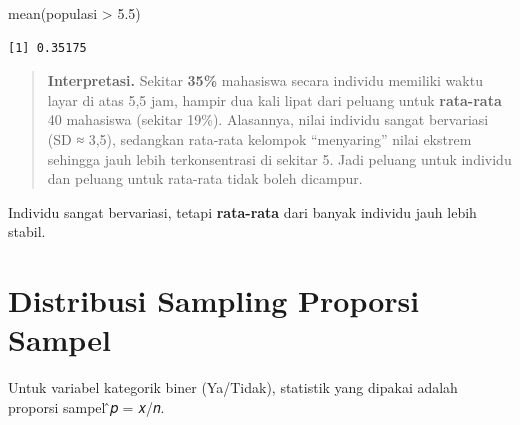 \documentclass[
  indonesian,
  letterpaper,
]{book}
\newenvironment{Shaded}{\begin{snugshade}}{\end{snugshade}}
\newcommand{\FloatTok}[1]{\textcolor[rgb]{0.68,0.00,0.00}{#1}}
\newcommand{\FunctionTok}[1]{\textcolor[rgb]{0.28,0.35,0.67}{#1}}
\newcommand{\NormalTok}[1]{\textcolor[rgb]{0.00,0.23,0.31}{#1}}
\newcommand{\SpecialCharTok}[1]{\textcolor[rgb]{0.37,0.37,0.37}{#1}}
\begin{document}
\begin{Shaded}
\begin{Highlighting}[]
\FunctionTok{mean}\NormalTok{(populasi }\SpecialCharTok{\textgreater{}} \FloatTok{5.5}\NormalTok{)}
\end{Highlighting}
\end{Shaded}

\begin{verbatim}
[1] 0.35175
\end{verbatim}

\begin{quote}
\textbf{Interpretasi.} Sekitar \textbf{35\%} mahasiswa secara individu
memiliki waktu layar di atas 5,5 jam, hampir dua kali lipat dari peluang
untuk \textbf{rata-rata} 40 mahasiswa (sekitar 19\%). Alasannya, nilai
individu sangat bervariasi (SD ≈ 3,5), sedangkan rata-rata kelompok
``menyaring'' nilai ekstrem sehingga jauh lebih terkonsentrasi di
sekitar 5. Jadi peluang untuk individu dan peluang untuk rata-rata tidak
boleh dicampur.
\end{quote}

Individu sangat bervariasi, tetapi \textbf{rata-rata} dari banyak
individu jauh lebih stabil.

\section{Distribusi Sampling Proporsi
Sampel}\label{distribusi-sampling-proporsi-sampel}

Untuk variabel kategorik biner (Ya/Tidak), statistik yang dipakai adalah
proporsi sampel ̂𝑝 = 𝑥/𝑛.
\end{document}
